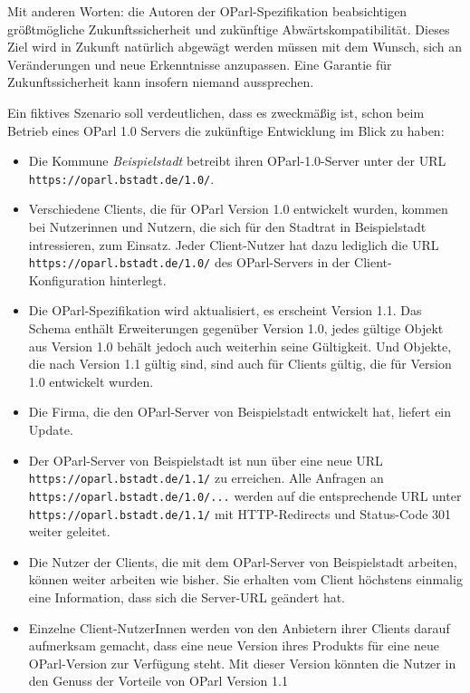 \documentclass[,a4paper]{article}
\begin{document}
Mit anderen Worten: die Autoren der OParl-Spezifikation beabsichtigen
größtmögliche Zukunftssicherheit und zukünftige Abwärtskompatibilität.
Dieses Ziel wird in Zukunft natürlich abgewägt werden müssen mit dem
Wunsch, sich an Veränderungen und neue Erkenntnisse anzupassen. Eine
Garantie für Zukunftssicherheit kann insofern niemand aussprechen.

Ein fiktives Szenario soll verdeutlichen, dass es zweckmäßig ist, schon
beim Betrieb eines OParl 1.0 Servers die zukünftige Entwicklung im Blick
zu haben:

\begin{itemize}
\item
  Die Kommune \emph{Beispielstadt} betreibt ihren OParl-1.0-Server unter
  der URL \texttt{https://oparl.bstadt.de/1.0/}.
\item
  Verschiedene Clients, die für OParl Version 1.0 entwickelt wurden,
  kommen bei Nutzerinnen und Nutzern, die sich für den Stadtrat in
  Beispielstadt intressieren, zum Einsatz. Jeder Client-Nutzer hat dazu
  lediglich die URL \texttt{https://oparl.bstadt.de/1.0/} des
  OParl-Servers in der Client-Konfiguration hinterlegt.
\item
  Die OParl-Spezifikation wird aktualisiert, es erscheint Version 1.1.
  Das Schema enthält Erweiterungen gegenüber Version 1.0, jedes gültige
  Objekt aus Version 1.0 behält jedoch auch weiterhin seine Gültigkeit.
  Und Objekte, die nach Version 1.1 gültig sind, sind auch für Clients
  gültig, die für Version 1.0 entwickelt wurden.
\item
  Die Firma, die den OParl-Server von Beispielstadt entwickelt hat,
  liefert ein Update.
\item
  Der OParl-Server von Beispielstadt ist nun über eine neue URL
  \texttt{https://oparl.bstadt.de/1.1/} zu erreichen. Alle Anfragen an
  \texttt{https://oparl.bstadt.de/1.0/...} werden auf die entsprechende
  URL unter \texttt{https://oparl.bstadt.de/1.1/} mit HTTP-Redirects und
  Status-Code 301 weiter geleitet.
\item
  Die Nutzer der Clients, die mit dem OParl-Server von Beispielstadt
  arbeiten, können weiter arbeiten wie bisher. Sie erhalten vom Client
  höchstens einmalig eine Information, dass sich die Server-URL geändert
  hat.
\item
  Einzelne Client-NutzerInnen werden von den Anbietern ihrer Clients
  darauf aufmerksam gemacht, dass eine neue Version ihres Produkts für
  eine neue OParl-Version zur Verfügung steht. Mit dieser Version
  könnten die Nutzer in den Genuss der Vorteile von OParl Version 1.1

\end{itemize}
\end{document}
